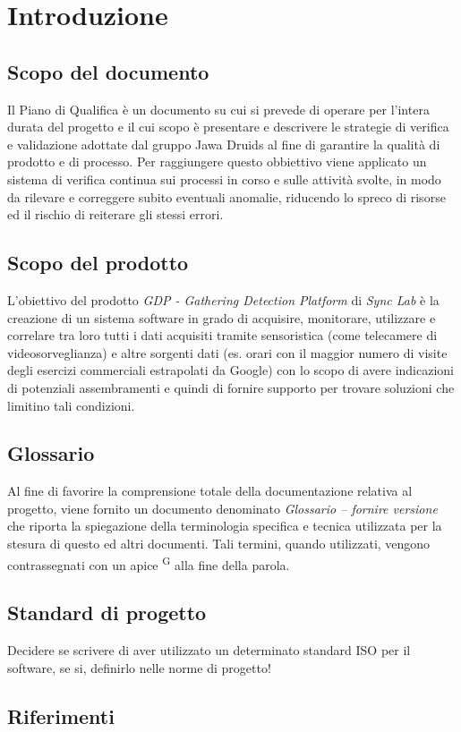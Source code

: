\chapter{Introduzione}

\section{Scopo del documento}
Il Piano di Qualifica è un documento su cui si prevede di operare per l’intera durata del progetto 
e il cui scopo è presentare e descrivere le strategie di verifica e validazione adottate 
dal gruppo Jawa Druids al fine di garantire la qualità di prodotto e di processo.  
Per raggiungere questo obbiettivo viene applicato un sistema di verifica continua sui processi in corso e 
sulle attività svolte, in modo da rilevare e correggere subito eventuali anomalie, riducendo lo spreco di risorse 
ed il rischio di reiterare gli stessi errori.
\section{Scopo del prodotto}
L'obiettivo del prodotto \textit{GDP - Gathering Detection Platform} di \textit{Sync Lab} è la creazione di un sistema software in 
grado di acquisire, monitorare, utilizzare e correlare tra loro tutti i dati acquisiti tramite sensoristica (come telecamere di videosorveglianza)
e altre sorgenti dati (es. orari con il maggior numero di visite degli esercizi commerciali estrapolati da Google) con lo
scopo di avere indicazioni di potenziali assembramenti e quindi di fornire supporto per trovare soluzioni che limitino tali condizioni.
\section{Glossario}
Al fine di favorire la comprensione totale della documentazione relativa al progetto, viene fornito un documento denominato \textit{Glossario -- fornire versione}
che riporta la spiegazione della terminologia specifica e tecnica utilizzata per la stesura di questo ed altri documenti.
Tali termini, quando utilizzati, vengono contrassegnati con un apice \textsuperscript{G} alla fine della parola.
\section{Standard di progetto}
Decidere se scrivere di aver utilizzato un determinato standard ISO per il software, se si, definirlo nelle norme di progetto!
\section{Riferimenti}
